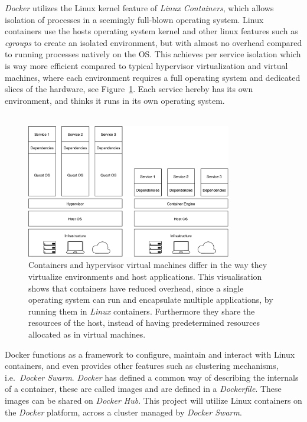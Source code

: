 \textit{Docker} utilizes the Linux kernel feature of \textit{Linux Containers},
which allows isolation of processes in a seemingly full-blown operating system.
Linux containers use the hosts operating system kernel and other linux features
such as \textit{cgroups} to create an isolated environment, but with almost no
overhead compared to running processes natively on the OS. 
This achieves per service isolation which is way more efficient compared to typical
hypervisor virtualization and virtual machines, where each environment requires
a full operating system and dedicated slices of the hardware, see
Figure~\ref{fig:hypervisorvscontainer}. Each service hereby has its own
environment, and thinks it runs in its own operating system.
\\\\
\begin{figure}[H]
\centering
\includegraphics[width=0.8\textwidth]{../media/hypervisorvscontainer.pdf}
\caption{Containers and hypervisor virtual machines differ in the way they 
	virtualize environments and host applications. This visualisation shows that 
	containers have reduced overhead, since a single operating system can run 
	and encapsulate multiple applications, by running them in \textit{Linux} 
	containers. Furthermore they share the resources of the host, instead of 
	having predetermined resources allocated as in virtual machines.}
\label{fig:hypervisorvscontainer}
\end{figure}

Docker functions as a framework to configure, maintain and interact with Linux
containers, and even provides other features such as clustering mechanisms, i.e.\
\textit{Docker Swarm}. \textit{Docker} has defined a common way of describing
the internals of a container, these are called images and are defined in a
\textit{Dockerfile}. These images can be shared on \textit{Docker Hub}.
This project will utilize Linux containers on the \textit{Docker} platform,
across a cluster managed by \textit{Docker Swarm}.
